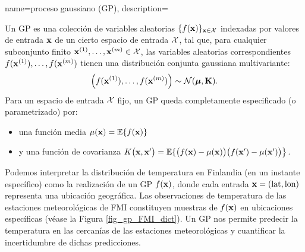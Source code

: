 {name={proceso gaussiano (GP)},
  description={Un GP es una colección de variables aleatorias
  	$\{f({\bf x})\}_{{\bf x} \in \mathcal{X}}$ indexadas por valores de entrada ${\bf x}$ 
  	de un cierto espacio de entrada $\mathcal{X}$, tal que, para cualquier subconjunto finito 
  	${\bf x}^{(1)}, \ldots, {\bf x}^{(m)} \in \mathcal{X}$, 
  	las variables aleatorias correspondientes $f({\bf x}^{(1)}), \ldots, f({\bf x}^{(m)})$ 
  	tienen una distribución conjunta gaussiana multivariante:
  	\[
  	\left( f({\bf x}^{(1)}), \ldots, f({\bf x}^{(m)}) \right) \sim \mathcal{N}(\boldsymbol{\mu}, \mathbf{K}).
  	\]
  	Para un espacio de entrada $\mathcal{X}$ fijo, un GP queda completamente especificado (o parametrizado) por:
  	\begin{itemize}
  		\item una función media $\mu({\bf x}) = \mathbb{E}\{ f({\bf x})\}$
  		\item y una función de covarianza $K\big({\bf x},{\bf x}'\big) = \mathbb{E}\{ \big(f({\bf x})-\mu({\bf x})\big) \big(f({\bf x}')-\mu({\bf x}')\big) \big\}$.
  	\end{itemize}
  	 Podemos interpretar la distribución de temperatura en Finlandia (en un instante específico)
  	como la realización de un GP $f({\bf x})$, donde cada entrada 
  	${\bf x} = (\text{lat}, \text{lon})$ representa una ubicación geográfica. 
  	Las observaciones de temperatura de las estaciones meteorológicas de FMI constituyen 
  	muestras de $f({\bf x})$ en ubicaciones específicas (véase la Figura \ref{fig_gp_FMI_dict}). 
  	Un GP nos permite predecir la temperatura en las cercanías de las estaciones meteorológicas 
  	y cuantificar la incertidumbre de dichas predicciones.
  	\begin{figure}[H]
  	\begin{center}
\end{center}
\end{figure}}}
